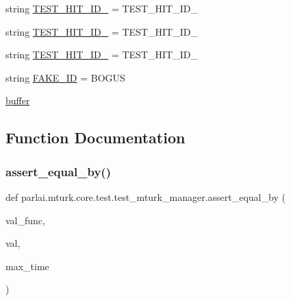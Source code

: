 \begin{DoxyCompactItemize}
\item 
string \hyperlink{namespaceparlai_1_1mturk_1_1core_1_1test_1_1test__mturk__manager_ae8616bef7def7e7ed6c3945d8d3fa0da}{T\+E\+S\+T\+\_\+\+H\+I\+T\+\_\+\+I\+D\+\_} = \textquotesingle{}T\+E\+S\+T\+\_\+\+H\+I\+T\+\_\+\+I\+D\+\_\textquotesingle{}
\item 
string \hyperlink{namespaceparlai_1_1mturk_1_1core_1_1test_1_1test__mturk__manager_ac8ab88d0d629037e7ee60efdfcab43f6}{T\+E\+S\+T\+\_\+\+H\+I\+T\+\_\+\+I\+D\+\_} = \textquotesingle{}T\+E\+S\+T\+\_\+\+H\+I\+T\+\_\+\+I\+D\+\_\textquotesingle{}
\item 
string \hyperlink{namespaceparlai_1_1mturk_1_1core_1_1test_1_1test__mturk__manager_a7b0c038477be19bb98957ced1edd479d}{T\+E\+S\+T\+\_\+\+H\+I\+T\+\_\+\+I\+D\+\_} = \textquotesingle{}T\+E\+S\+T\+\_\+\+H\+I\+T\+\_\+\+I\+D\+\_\textquotesingle{}
\item 
string \hyperlink{namespaceparlai_1_1mturk_1_1core_1_1test_1_1test__mturk__manager_a1fff474639f575cae12248a14cf2b967}{F\+A\+K\+E\+\_\+\+ID} = \textquotesingle{}B\+O\+G\+US\textquotesingle{}
\item 
\hyperlink{namespaceparlai_1_1mturk_1_1core_1_1test_1_1test__mturk__manager_a66cdf49dc350e6730b30c25491e06861}{buffer}
\end{DoxyCompactItemize}


\subsection{Function Documentation}
\mbox{\label{namespaceparlai_1_1mturk_1_1core_1_1test_1_1test__mturk__manager_a1fd7ac4fedefa65d2416601107dbe44c}} 
\subsubsection{\texorpdfstring{assert\+\_\+equal\+\_\+by()}{assert\_equal\_by()}}
{\footnotesize\ttfamily def parlai.\+mturk.\+core.\+test.\+test\+\_\+mturk\+\_\+manager.\+assert\+\_\+equal\+\_\+by (\begin{DoxyParamCaption}\item[{}]{val\+\_\+func,  }\item[{}]{val,  }\item[{}]{max\+\_\+time }\end{DoxyParamCaption})}



